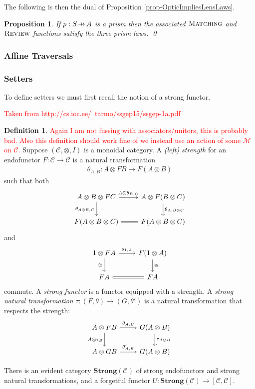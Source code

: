 \documentclass[11pt,a4paper]{article}
\theoremstyle{plain}
\newtheorem{proposition}[theorem]{Proposition}
\theoremstyle{definition}
\newtheorem{definition}[theorem]{Definition}
\newcommand{\C}{\mathscr{C}}
\newcommand{\M}{\mathscr{M}}
\newcommand{\Strong}{\mathbf{Strong}}
\newcommand{\freview}{\textsc{Review}}
\newcommand{\fmatching}{\textsc{Matching}}
\newcommand{\hto}{\ensuremath{\,\mathaccent\shortmid\rightarrow\,}}
\newcommand{\todo}[1]{\textcolor{red}{\small #1}}
\begin{document}
The following is then the dual of Proposition \ref{prop-OpticImpliesLensLaws}.
\begin{proposition}
\label{prop-OpticImpliesPrismLaws}
If $p : S \hto A$ is a prism then the associated $\fmatching$ and $\freview$ functions satisfy the three prism laws. \qed
\end{proposition}

\subsubsection{Affine Traversals}

\subsubsection{Setters}

To define setters we must first recall the notion of a strong functor.

\todo{Taken from http://cs.ioc.ee/~tarmo/ssgep15/ssgep-1a.pdf}
\begin{definition}
\todo{Again I am not fussing with associators/unitors, this is probably bad. Also this definition should work fine of we instead use an action of some $\M$ on $\C$.} Suppose $(\C, \otimes, I)$ is a monoidal category. A \emph{(left) strength} for an endofunctor $F : \C \to \C$ is a natural transformation
\begin{align*}
\theta_{A,B} : A \otimes F B \to F(A \otimes B)
\end{align*}
such that both
\[
\begin{tikzcd}
A \otimes B \otimes F C \ar[r, "A \otimes \theta_{B,C}"] \ar[d, "\theta_{A \otimes B, C}" left]  & A \otimes F(B\otimes C) \ar[d, "\theta_{A, B\otimes C}" right] \\
F(A \otimes B \otimes C) \ar[r, equals]& F(A \otimes B \otimes C)
\end{tikzcd}
\]
and
\[
\begin{tikzcd}
1 \otimes F A \ar[r, "s_{1,A}"] \ar[d, "\cong" left]  & F(1 \otimes A) \ar[d, "\cong" right] \\
F A \ar[r, equals] & F A
\end{tikzcd}
\]
commute. A \emph{strong functor} is a functor equipped with a strength. A \emph{strong natural transformation} $\tau : (F,\theta) \to (G,\theta')$ is a natural transformation that respects the strength:
\[
\begin{tikzcd}
A \otimes F B \ar[r, "\theta_{A,B}"] \ar[d, "A \otimes \tau_B" left]  & G(A \otimes B) \ar[d, "\tau_{A \otimes B}" right] \\
A \otimes G B \ar[r, "\theta'_{A, B}"]& G(A \otimes B)
\end{tikzcd}
\]

There is an evident category $\Strong(\C)$ of strong endofunctors and strong natural transformations, and a forgetful functor $U : \Strong(\C) \to [\C, \C]$.
\end{definition}
\end{document}
